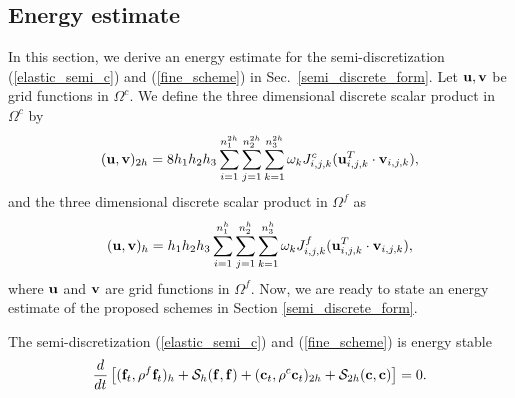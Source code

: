 \subsection{Energy estimate}\label{sec_energy}
In this section, we derive an energy estimate for the semi-discretization (\ref{elastic_semi_c}) and (\ref{fine_scheme}) in Sec.~\ref{semi_discrete_form}. Let ${\bf u}, {\bf v}$ be grid functions in $\Omega^c$. We define the three dimensional discrete scalar product in $\Omega^c$ by
\begin{equation}\label{scalar_product_inner}
({\bf u}, {\bf v})_{2h} = 8h_1h_2h_3\sum_{i=1}^{n_1^{2h}}\sum_{j=1}^{n_2^{2h}}\sum_{k=1}^{n_3^{2h}}\omega_k{J}_{i,j,k}^{c}({\bf u}_{i,j,k}^T\cdot {\bf v}_{i,j,k}),
\end{equation}
and the three dimensional discrete scalar product in $\Omega^f$ as
\begin{equation}\label{scalar_product_inner_f}
({\bf u}, {\bf v})_{h} = h_1h_2h_3\sum_{i=1}^{n_1^{h}}\sum_{j=1}^{n_2^{h}}\sum_{k=1}^{n_3^{h}}\omega_k{J}_{i,j,k}^{f}({\bf u}_{i,j,k}^T\cdot {\bf v}_{i,j,k}),
\end{equation}
where $\bf u$ and $\bf v$ are grid functions in $\Omega^f$. Now, we are ready to state an energy estimate of the proposed schemes in Section \ref{semi_discrete_form}. 
 \begin{theorem}\label{thm1}
  The semi-discretization (\ref{elastic_semi_c}) and (\ref{fine_scheme}) is energy stable 
  \[
  \frac{d}{dt}\left[({\bf f}_t,\rho^f {\bf f}_t)_{h} + \mathcal{S}_{h}({\bf f},{\bf f}) + ({\bf c}_t,\rho^{c} {\bf c}_t)_{2h} + \mathcal{S}_{2h}({\bf c},{\bf c}) \right]   = 0.
  \]
 \end{theorem}
